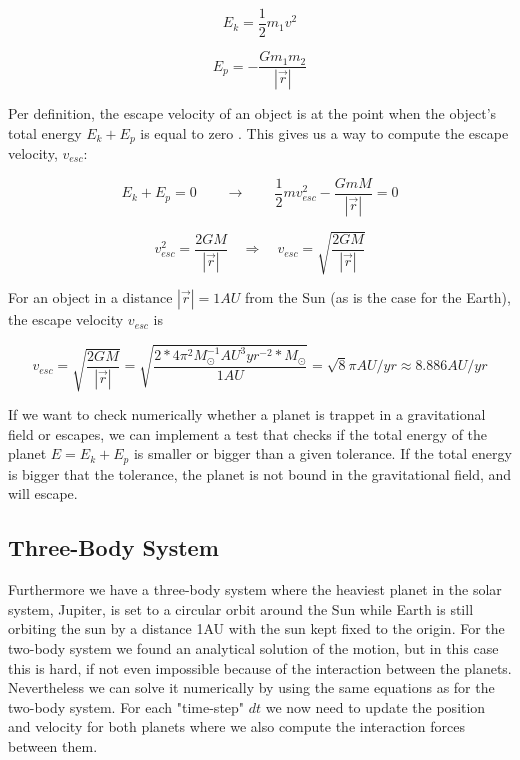 \documentclass[norsk,a4paper,12pt]{article}
\begin{document}
\begin{equation}
    E_k = \frac{1}{2} m_1 v^2
    \label{eq:kineticE}
\end{equation}

\begin{equation}
    E_p = - \frac{G m_1 m_2}{|\vec{r}|}
    \label{eq:potE}
\end{equation}
\par 
\vspace{3mm}

Per definition, the escape velocity of an object is at the point when the object's total energy $E_k + E_p$ is equal to zero \cite{kepler}. This gives us a way to compute the escape velocity, $v_{esc}$:

\begin{equation*}
    E_k + E_p = 0 \qquad \rightarrow \qquad \frac{1}{2} m v_{esc}^2 - \frac{G m M}{|\vec{r}|} = 0
\end{equation*}

\begin{equation}
     v_{esc}^2 = \frac{2 G M}{|\vec{r}|} \quad \Rightarrow \quad v_{esc} = \sqrt{\frac{2 G M}{|\vec{r}|}}
     \label{esc_v}
\end{equation}

For an object in a distance $|\vec{r}| = 1AU$ from the Sun (as is the case for the Earth), the escape velocity $v_{esc}$ is 

\begin{equation*}
    v_{esc} = \sqrt{\frac{2 G M}{|\vec{r}|}} = \sqrt{\frac{2 * 4\pi^2 M_{\odot} ^{-1} AU^3 yr^{-2} * M_{\odot}}{1 AU}} = \sqrt{8}\pi AU/yr \approx 8.886 AU/yr
\end{equation*}

If we want to check numerically whether a planet is trappet in a gravitational field or escapes, we can implement a test that checks if the total energy of the planet $E = E_k + E_p$ is smaller or bigger than a given tolerance. If the total energy is bigger that the tolerance, the planet is not bound in the gravitational field, and will escape.

\subsection{Three-Body System}
Furthermore we have a three-body system where the heaviest planet in the solar system, Jupiter, is set to a circular orbit around the Sun while Earth is still orbiting the sun by a distance 1AU with the sun kept fixed to the origin. For the two-body system we found an analytical solution of the motion, but in this case this is hard, if not even impossible because of the interaction between the planets. Nevertheless we can solve it numerically by using the same equations as for the two-body system. For each "time-step" $dt$ we now need to update the position and velocity for both planets where we also compute the interaction forces between them. 
\end{document}
